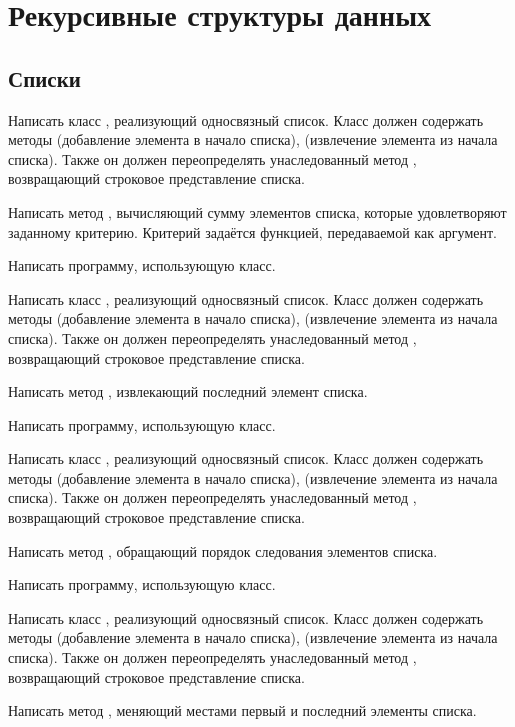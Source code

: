 \section{Рекурсивные структуры данных}

\subsection{Списки}

\task Написать класс , реализующий односвязный
список. Класс должен содержать методы  (добавление элемента
в начало списка),  (извлечение элемента из начала
списка). Также он должен переопределять унаследованный метод
, возвращающий строковое представление списка.

Написать метод , вычисляющий сумму элементов списка, которые
удовлетворяют заданному критерию. Критерий задаётся функцией,
передаваемой как аргумент.

Написать программу, использующую класс.

\task Написать класс , реализующий односвязный
список. Класс должен содержать методы  (добавление элемента
в начало списка),  (извлечение элемента из начала
списка). Также он должен переопределять унаследованный метод
, возвращающий строковое представление списка.

Написать метод , извлекающий последний элемент списка.

Написать программу, использующую класс.

\task Написать класс , реализующий односвязный
список. Класс должен содержать методы  (добавление элемента
в начало списка),  (извлечение элемента из начала
списка). Также он должен переопределять унаследованный метод
, возвращающий строковое представление списка.

Написать метод , обращающий порядок следования элементов
списка.

Написать программу, использующую класс.

\task Написать класс , реализующий односвязный
список. Класс должен содержать методы  (добавление элемента
в начало списка),  (извлечение элемента из начала
списка). Также он должен переопределять унаследованный метод
, возвращающий строковое представление списка.

Написать метод , меняющий местами первый и последний
элементы списка.

